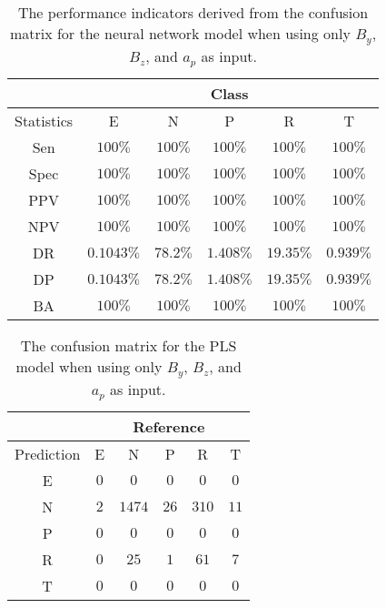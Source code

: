 \begin{table}[!ht]
	\centering
	\begin{tabular}{|c|c|c|c|c|c|}
		\hline
		 & \multicolumn{5}{c|}{Class} \\ \hline
		Statistics & E & N & P & R & T \\ \hline
		Sen & $100\%$ & $100\%$ & $100\%$ & $100\%$ & $100\%$ \\ \hline
		Spec & $100\%$ & $100\%$ & $100\%$ & $100\%$ & $100\%$ \\ \hline
		PPV & $100\%$ & $100\%$ & $100\%$ & $100\%$ & $100\%$ \\ \hline
		NPV & $100\%$ & $100\%$ & $100\%$ & $100\%$ & $100\%$ \\ \hline
		DR & $0.1043\%$ & $78.2\%$ & $1.408\%$ & $19.35\%$ & $0.939\%$ \\ \hline
		DP & $0.1043\%$ & $78.2\%$ & $1.408\%$ & $19.35\%$ & $0.939\%$ \\ \hline
		BA & $100\%$ & $100\%$ & $100\%$ & $100\%$ & $100\%$ \\ \hline
	\end{tabular}
	\caption{The performance indicators derived from the confusion matrix for the neural network model when using only $B_{y}$, $B_{z}$, and $a_{p}$ as input.}
	\label{tab:cs:reverse:yzap:nnet}
\end{table}

\begin{table}[!ht]
	\centering
	\begin{tabular}{|c|c|c|c|c|c|}
		\hline
		 & \multicolumn{5}{|c|}{Reference} \\ \hline
		 Prediction & E & N & P & R & T \\ \hline
		 E & $0$ & $0$ & $0$ & $0$ & $0$ \\ \hline
		 N & $2$ & $1474$ & $26$ & $310$ & $11$ \\ \hline
		 P & $0$ & $0$ & $0$ & $0$ & $0$ \\ \hline
		 R & $0$ & $25$ & $1$ & $61$ & $7$ \\ \hline
		 T & $0$ & $0$ & $0$ & $0$ & $0$ \\ \hline
	\end{tabular}
	\caption{The confusion matrix for the PLS model when using only $B_{y}$, $B_{z}$, and $a_{p}$ as input.}
	\label{tab:cm:yzap:pls}
\end{table}

